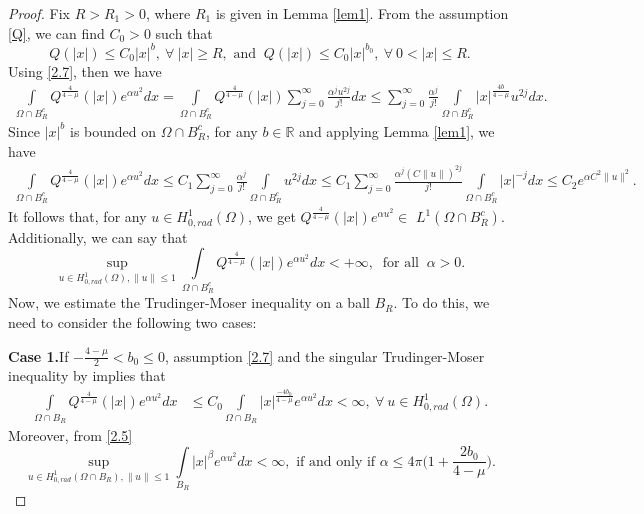 \documentclass[11pt]{amsart}
\numberwithin{equation}{section}
\newenvironment{case}[1]{\par\noindent\textbf{Case 1.}\space#1}{}
\newcommand{\R}{\mathbb{R}}
\newcommand{\hr}{H^1_{0, rad}(\Omega)}
\newcommand{\1}{\frac{1}{2}}
\begin{document}
	\begin{proof}
		Fix $R>R_1>0$, where $R_1$ is given in Lemma \ref{lem1}. From the assumption \eqref{Q}, we can find $C_0>0$ such that
		\begin{equation}
			\label{2.7}
			Q(|x|) \leq C_0|x|^b, \ \forall \ |x| \geq R, \text{ and } \ Q(|x|) \leq C_0|x|^{b_0}, \ \forall \ 0<|x| \leq R.
		\end{equation}
		Using \eqref{2.7}, then we have
		\begin{align}
			\int\limits_{\Omega \cap B_R^c} Q^{\frac{4}{4-\mu}}(|x|)e^{\alpha u^2}dx = \int\limits_{\Omega \cap B_R^c} Q^{\frac{4}{4-\mu}}(|x|) \sum_{j=0}^{\infty} \frac{\alpha^j u^{2j}}{j!}dx \leq \sum_{j=0}^{\infty} \frac{\alpha^j }{j!}\int\limits_{\Omega \cap B_R^c} |x|^{\frac{4b}{4-\mu}} u^{2j}dx. \nonumber
		\end{align}
		Since $|x|^b$ is bounded on $\Omega \cap B_R^c$, for any $b\in \R$ and applying Lemma \ref{lem1}, we have
		\begin{align}
			\int\limits_{\Omega \cap B_R^c} Q^{\frac{4}{4-\mu}}(|x|)e^{\alpha u^2}dx\leq C_1\sum_{j=0}^{\infty} \frac{\alpha^j }{j!}\int\limits_{\Omega \cap B_R^c} u^{2j}dx \leq C_1\sum_{j=0}^{\infty} \frac{\alpha^j (C\|u\|)^{2j} }{j!}\int\limits_{\Omega \cap B_R^c} |x|^{-j}dx \leq C_2 e^{\alpha C^2\|u\|^2}. \nonumber
		\end{align}
		It follows that, for any $u\in \hr$, we get $Q^{\frac{4}{4-\mu}}(|x|)e^{\alpha u^2} \in$ $L^1(\Omega \cap B_R^c)$. Additionally, we can say that
		\begin{equation}
			\label{2.8}
			\sup_{u\in \hr, \|u\| \leq 1} \int\limits_{\Omega \cap B_R^c} Q^{\frac{4}{4-\mu}}(|x|)e^{\alpha u^2}dx < +\infty, \ \text{ for all } \ \alpha>0.
		\end{equation}
		Now, we estimate the Trudinger-Moser inequality on a ball $B_R$.
		To do this, we need to consider the following two cases:
		\begin{case}
			If $-\frac{4-\mu}{2} <b_0 \leq 0$, assumption \eqref{2.7} and the singular Trudinger-Moser inequality by \cite{Sandeep} implies that
			\begin{align}
				\int\limits_{\Omega \cap B_R} Q^{\frac{4}{4-\mu}}(|x|)e^{\alpha u^2}dx & \leq C_0\int\limits_{\Omega \cap B_R} |x|^{\frac{-4b_0}{4-\mu}}e^{\alpha u^2}dx < \infty, \ \forall \ u\in \hr. \nonumber
			\end{align}
			Moreover, from \eqref{2.5}
			\begin{equation*}
				\sup_{u\in H^1_{0,rad}(\Omega \cap B_R), \|u\|\leq 1} \int\limits_{B_R} |x|^{\beta}  e^{\alpha u^2} dx < \infty, \text{ if and only if }  \alpha \leq 4\pi \Big( 1+ \frac{2b_0}{4-\mu}\Big).

\end{equation*}
\end{case}
\end{proof}
\end{document}
